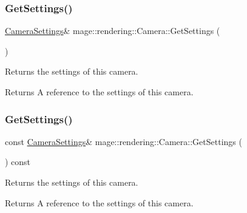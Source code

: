 \hypertarget{classmage_1_1rendering_1_1_camera_a32588a00052469be808d2819953ea2a4}{}\label{classmage_1_1rendering_1_1_camera_a32588a00052469be808d2819953ea2a4} 
\subsubsection{\texorpdfstring{Get\+Settings()}{GetSettings()}\hspace{0.1cm}{\footnotesize\ttfamily [1/2]}}
{\footnotesize\ttfamily \hyperlink{classmage_1_1rendering_1_1_camera_settings}{Camera\+Settings}\& mage\+::rendering\+::\+Camera\+::\+Get\+Settings (\begin{DoxyParamCaption}{ }\end{DoxyParamCaption})\hspace{0.3cm}{\ttfamily [noexcept]}}

Returns the settings of this camera.

\begin{DoxyReturn}{Returns}
A reference to the settings of this camera. 
\end{DoxyReturn}
\hypertarget{classmage_1_1rendering_1_1_camera_a65d79baabdaaf9847102a03f6965e0ed}{}\label{classmage_1_1rendering_1_1_camera_a65d79baabdaaf9847102a03f6965e0ed} 
\subsubsection{\texorpdfstring{Get\+Settings()}{GetSettings()}\hspace{0.1cm}{\footnotesize\ttfamily [2/2]}}
{\footnotesize\ttfamily const \hyperlink{classmage_1_1rendering_1_1_camera_settings}{Camera\+Settings}\& mage\+::rendering\+::\+Camera\+::\+Get\+Settings (\begin{DoxyParamCaption}{ }\end{DoxyParamCaption}) const\hspace{0.3cm}{\ttfamily [noexcept]}}

Returns the settings of this camera.

\begin{DoxyReturn}{Returns}
A reference to the settings of this camera. 
\end{DoxyReturn}
\hypertarget{classmage_1_1rendering_1_1_camera_aff1dea377f7f36b1d518369b3f8108cc}{}\label{classmage_1_1rendering_1_1_camera_aff1dea377f7f36b1d518369b3f8108cc} 
